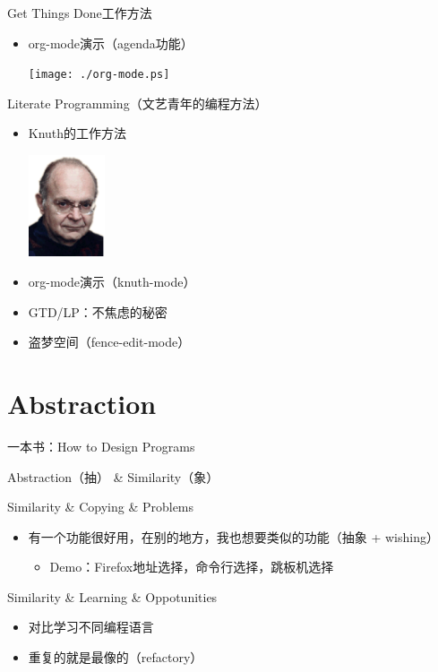 \documentclass[presentation,dvipdfmx,CJKbookmarks]{beamer}
\begin{document}
\begin{CJK*}{UTF8}{simsun}
\begin{frame}[label={sec:org1b2988e}]{Get Things Done\thinspace 工作方法}
\begin{itemize}[<+->]
\item org-mode\thinspace 演示（agenda\thinspace 功能）

\begin{center}
\texttt{[image: ./org-mode.ps]}
\end{center}
\end{itemize}
\end{frame}

\begin{frame}[label={sec:org9a5c6cc}]{Literate Programming（文艺青年的编程方法）}
\begin{itemize}[<+->]
\item Knuth\thinspace 的工作方法

\begin{center}
\includegraphics[height=3cm]{./knuth.ps}
\end{center}

\item org-mode\thinspace 演示（knuth-mode）
\item GTD/LP：不焦虑的秘密
\item 盗梦空间（fence-edit-mode）
\end{itemize}
\end{frame}

\section{Abstraction}
\label{sec:org6df763a}

\begin{frame}[label={sec:org4b34056}]{一本书：How to Design Programs}
\pause
\begin{block}{Abstraction（抽） \& Similarity（象）}
\pause
\end{block}
\begin{block}{Similarity \& Copying \& Problems}
\pause
\begin{itemize}
\item 有一个功能很好用，在别的地方，我也想要类似的功能（抽象 + wishing）
\begin{itemize}
\item Demo：Firefox\thinspace 地址选择，命令行选择，跳板机选择
\end{itemize}
\end{itemize}
\pause
\end{block}
\begin{block}{Similarity \& Learning \& Oppotunities}
\begin{itemize}
\item 对比学习不同编程语言
\item 重复的就是最像的（refactory）
\end{itemize}
\end{block}
\end{frame}


\end{CJK*}
\end{document}
